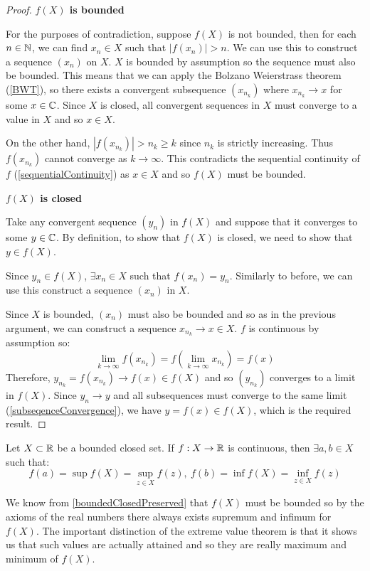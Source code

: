 \documentclass[../main.tex]{subfiles}
\begin{document}
\begin{proof}\par
  \textbf{$f(X)$ is bounded}\par
  For the purposes of contradiction, suppose $f(X)$ is not bounded, then for each $n \in \mathbb{N}$, we can find $x_n \in X$ such that $|f(x_n)| > n$.
  We can use this to construct a sequence $(x_n)$ on $X$.
  $X$ is bounded by assumption so the sequence must also be bounded.
  This means that we can apply the Bolzano Weierstrass theorem (\cref{BWT}), so there exists a convergent subsequence $(x_{n_k})$ where $x_{n_k} \to x$ for some $x \in \mathbb{C}$.
  Since $X$ is closed, all convergent sequences in $X$ must converge to a value in $X$ and so $x \in X$.

  On the other hand, $|f(x_{n_k})| > n_k \geq k$ since $n_k$ is strictly increasing.
  Thus $f(x_{n_k})$ cannot converge as $k \to \infty$.
  This contradicts the sequential continuity of $f$ (\cref{sequentialContinuity}) as $x \in X$ and so $f(X)$ must be bounded.

  \textbf{$f(X)$ is closed}\par
  Take any convergent sequence $(y_n)$ in $f(X)$ and suppose that it converges to some $y \in \mathbb{C}$.
  By definition, to show that $f(X)$ is closed, we need to show that $y \in f(X)$.

  Since $y_n \in f(X)$, $\exists x_n \in X$ such that $f(x_n) = y_n$.
  Similarly to before, we can use this construct a sequence $(x_n)$ in $X$.

  Since $X$ is bounded, $(x_n)$ must also be bounded and so as in the previous argument, we can construct a sequence $x_{n_k} \to x \in X$.
  $f$ is continuous by assumption so:
  \[
    \lim_{k \to \infty} f(x_{n_k}) = f\left(\lim_{k \to \infty} x_{n_k}\right) = f(x)
  \]
  Therefore, $y_{n_k} = f(x_{n_k}) \to f(x) \in f(X)$ and so $(y_{n_k})$ converges to a limit in $f(X)$.
  Since $y_n \to y$ and all subsequences must converge to the same limit (\cref{subseqenceConvergence}), we have $y = f(x) \in f(X)$, which is the required result.
\end{proof}
\begin{theorem}
  Let $X \subset \mathbb{R}$ be a bounded closed set.
  If $f: X \to \mathbb{R}$ is continuous, then $\exists a, b \in X$ such that:
  \label{EVT}
  \[
    f(a) = \sup f(X) = \sup_{z \in X} f(z),\ f(b) = \inf f(X) = \inf_{z \in X} f(z)
  \]
\end{theorem}
\begin{remark}
  We know from \cref{boundedClosedPreserved} that $f(X)$ must be bounded so by the axioms of the real numbers there always exists supremum and infimum for $f(X)$.
  The important distinction of the extreme value theorem is that it shows us that such values are actually attained and so they are really maximum and minimum of $f(X)$.
\end{remark}
\end{document}
